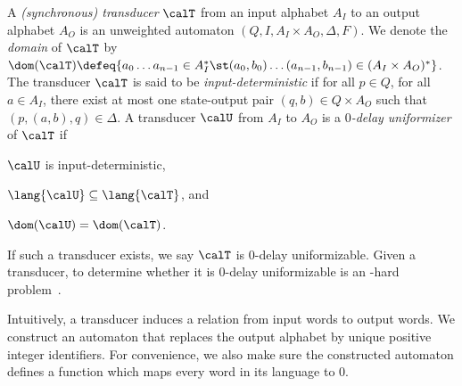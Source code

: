 \documentclass[a4paper]{article}
\begin{document}
A \emph{(synchronous) transducer} $\calT$ from an input alphabet $A_I$ to an
output alphabet $A_O$ is an unweighted automaton $(Q,I,A_I \times
A_O,\Delta,F)$. We denote the \emph{domain} of $\calT$ by $\dom(\calT) \defeq \{
a_0 \dots a_{n-1} \in A_I^* \st (a_0,b_0) \dots (a_{n-1},b_{n-1}) \in
(A_I \times A_O)^*\}$. The transducer $\calT$ is said to be
\emph{input-deterministic} if
for all $p \in Q$, for all $a \in A_I$, there
exist at most one state-output pair $(q,b) \in Q \times A_O$ such that
$(p,(a,b),q) \in \Delta$.
A transducer $\calU$ from $A_I$ to $A_O$ is a
\emph{$0$-delay uniformizer} of $\calT$ if
\begin{inparaenum}[$(i)$]
	\item $\calU$ is input-deterministic,
	\item $\lang{\calU} \subseteq \lang{\calT}$, and
	\item $\dom(\calU) = \dom(\calT)$.
\end{inparaenum}
If such a transducer exists, we say $\calT$ is $0$-delay uniformizable. Given a
transducer, to determine whether it is $0$-delay uniformizable is an \EXP-hard
problem~\cite{fjlw16}.

Intuitively, a transducer induces a relation from input words to output words.
We construct an automaton that replaces the output alphabet by unique positive
integer identifiers. For convenience, we also make sure the constructed
automaton defines a function which maps every word in its language to $0$. 
\end{document}
